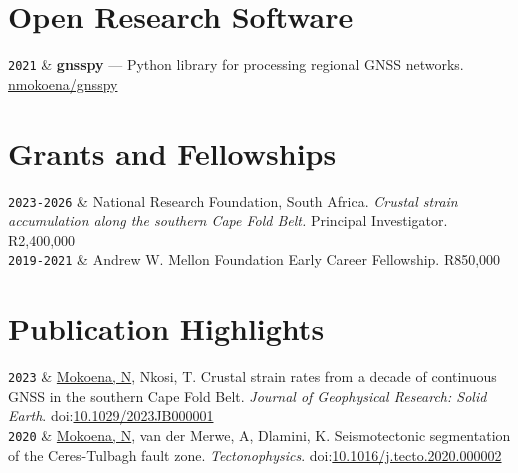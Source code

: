 \documentclass[9pt,a4paper]{article}
\newcommand{\LastName}{Mokoena}
\newcommand{\Initials}{N}
\newcommand{\Me}{\underline{\LastName, \Initials}}  %
\newcommand{\Thabo}{Nkosi, T}
\newcommand{\Anja}{van der Merwe, A}
\newcommand{\Kagiso}{Dlamini, K}
\newcommand{\Duration}[2]{\fontsize{10pt}{0}\selectfont \texttt{#1-#2}}
\newcommand{\Year}[1]{\fontsize{10pt}{0}\selectfont \texttt{#1}}
\newcommand{\DOI}[1]{doi:\href{https://doi.org/#1}{#1}}
\newcommand{\GitHub}[1]{\faGithub{} \href{https://github.com/#1}{#1}}
\begin{document}
\section{Open Research Software}

\begin{EntriesTableYear}
  \Year{2021}  &
  \textbf{gnsspy} --- Python library for processing regional GNSS
  networks. \GitHub{nmokoena/gnsspy}
\end{EntriesTableYear}

\section{Grants and Fellowships}

\begin{EntriesTableDuration}
  \Duration{2023}{2026}  &
  National Research Foundation, South Africa. \textit{Crustal strain
  accumulation along the southern Cape Fold Belt.} Principal Investigator.
  R2,400,000
  \\
  \Duration{2019}{2021}  &
  Andrew W. Mellon Foundation Early Career Fellowship. R850,000
\end{EntriesTableDuration}

\section{Publication Highlights}

\begin{EntriesTableYear}
  \Year{2023}  &
  \Me{}, \Thabo{}. Crustal strain rates from a decade of continuous GNSS
  in the southern Cape Fold Belt. \textit{Journal of Geophysical Research:
  Solid Earth}. \DOI{10.1029/2023JB000001}
  \\
  \Year{2020}  &
  \Me{}, \Anja{}, \Kagiso{}. Seismotectonic segmentation of the
  Ceres-Tulbagh fault zone. \textit{Tectonophysics}.
  \DOI{10.1016/j.tecto.2020.000002}
\end{EntriesTableYear}
\end{document}
